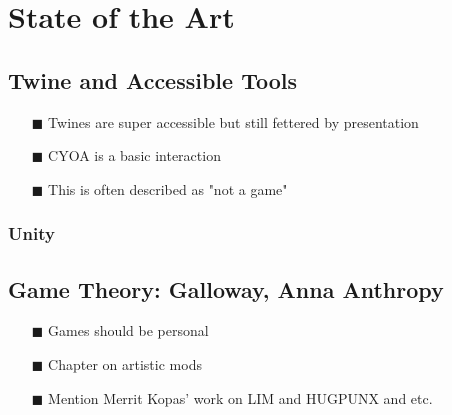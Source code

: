 
\chapter{State of the Art} %

\label{Chapter3} %




\section{Twine and Accessible Tools}
\begin{itemize}
\item[\tiny{$\blacksquare$}] Twines are super accessible but still fettered by presentation
\item[\tiny{$\blacksquare$}] CYOA is a basic interaction
\item[\tiny{$\blacksquare$}] This is often described as "not a game"
\end{itemize}
\subsection{Unity}



\section{Game Theory: Galloway, Anna Anthropy}
\begin{itemize}
\item[\tiny{$\blacksquare$}] Games should be personal
\item[\tiny{$\blacksquare$}] Chapter on artistic mods
\item[\tiny{$\blacksquare$}] Mention Merrit Kopas' work on LIM and HUGPUNX and etc.
\end{itemize}